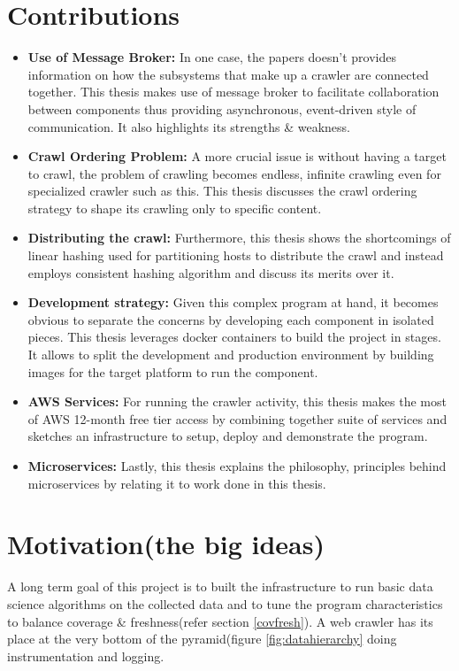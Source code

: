 \section{Contributions}
\begin{itemize}
  \item \textbf{Use of Message Broker:} In one case, the papers doesn't provides information on how the subsystems that make up a crawler are connected together. This thesis makes use of message broker to facilitate collaboration between components thus providing asynchronous, event-driven style of communication. It also highlights its strengths \& weakness.
   \item \textbf{Crawl Ordering Problem:} A more crucial issue is without having a target to crawl, the problem of crawling becomes endless, infinite crawling even for specialized crawler such as this. This thesis discusses the crawl ordering strategy to shape its crawling only to specific content.
   \item \textbf{Distributing the crawl:} Furthermore, this thesis shows the shortcomings of linear hashing used for partitioning hosts to distribute the crawl and instead employs consistent hashing\cite{consisthash} algorithm and discuss its merits over it.
    \item \textbf{Development strategy:}  Given this complex program at hand, it becomes obvious to separate the concerns by developing each component in isolated pieces. This thesis leverages docker containers to build the project in stages. It allows to split the development and production environment by building images for the target platform to run the component.
    \item \textbf{AWS Services:} For running the crawler activity, this thesis makes the most of AWS 12-month free tier access by combining together suite of services and sketches an infrastructure to setup, deploy and demonstrate the program.
    \item \textbf{Microservices:} Lastly, this thesis explains the philosophy, principles behind microservices \cite{microservices} by relating it to work done in this thesis.
\end{itemize}

\pagebreak

\section{Motivation(the big ideas)}
A long term goal of this project is to built the infrastructure to run basic data science algorithms on the collected data and to tune the program characteristics to balance coverage \& freshness(refer section \ref{covfresh}). A web crawler has its place at the very bottom of the pyramid(figure \ref{fig:datahierarchy} doing instrumentation and logging.

